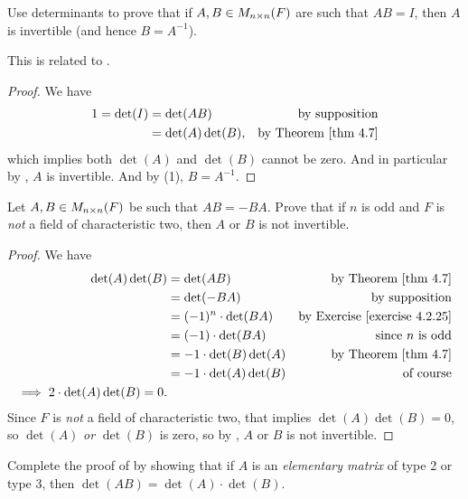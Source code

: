 \begin{exercise} \label{exercise 4.3.16}
Use determinants to prove that if \(A, B \in M_{n \times n}(F)\) are such that \(AB = I\), then \(A\) is invertible (and hence \(B = A^{-1}\)).
\end{exercise}

\begin{note}
This is related to .
\end{note}

\begin{proof}
We have
\begin{align*}
    1 = \det(I) & = \det(AB) & \text{by supposition} \\
                & = \det(A) \det(B), & \text{by \THM{4.7}}
\end{align*}
which implies both \(\det(A)\) and \(\det(B)\) cannot be zero.
And in particular by , \(A\) is invertible.
And by (1), \(B = A^{-1}\).
\end{proof}

\begin{exercise} \label{exercise 4.3.17}
Let \(A, B \in M_{n \times n}(F)\) be such that \(AB = -BA\).
Prove that if \(n\) is odd and \(F\) is \emph{not} a field of characteristic two, then \(A\) or \(B\) is not invertible.
\end{exercise}

\begin{proof}
We have
\begin{align*}
    \det(A) \det(B) & = \det(AB) & \text{by \THM{4.7}} \\
                    & = \det(-BA) & \text{by supposition} \\
                    & = (-1)^n \cdot \det(BA) & \text{by \EXEC{4.2.25}} \\
                    & = (-1) \cdot \det(BA) & \text{since \(n\) is odd} \\
                    & = -1 \cdot \det(B) \det(A) & \text{by \THM{4.7}} \\
                    & = -1 \cdot \det(A) \det(B) & \text{of course} \\
    \implies 2 \cdot \det(A) \det(B) = 0.
\end{align*}
Since \(F\) is \emph{not} a field of characteristic two, that implies \(\det(A) \det(B) = 0\), so \(\det(A)\) \emph{or} \(\det(B)\) is zero, so by , \(A\) or \(B\) is not invertible.
\end{proof}

\begin{exercise} \label{exercise 4.3.18}
Complete the proof of  by showing that if \(A\) is an \emph{elementary matrix} of type 2 or type 3, then \(\det(AB) = \det(A) \cdot \det(B)\).
\end{exercise}

